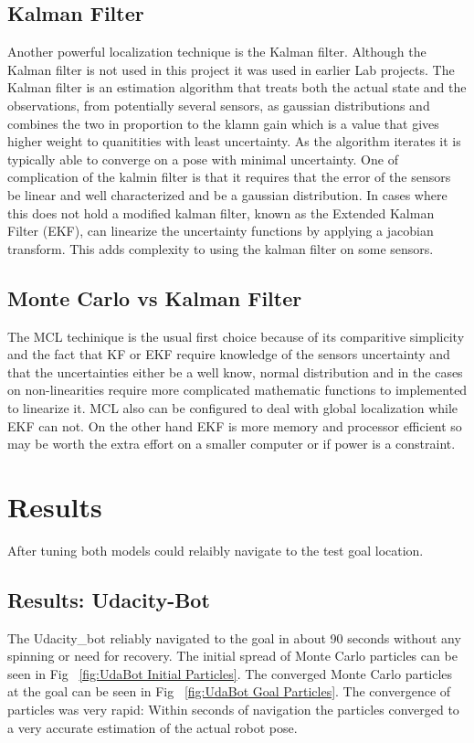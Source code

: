 \documentclass[10pt,journal,compsoc]{IEEEtran}
\begin{document}
\subsection{Kalman Filter}
Another powerful localization technique is the Kalman filter. Although the Kalman filter is not used in this project it was used in earlier Lab projects. The Kalman filter is an estimation algorithm that treats both the actual state and the observations, from potentially several sensors, as gaussian distributions and combines the two in proportion to the klamn gain which is a value that gives higher weight to quanitities with least uncertainty. As the algorithm iterates it is typically able to converge on a pose with minimal uncertainty.
One of complication of the kalmin filter is that it requires that the error of the sensors be linear and well characterized and be a gaussian distribution. In cases where this does not hold a modified kalman filter, known as the Extended Kalman Filter (EKF), can linearize the uncertainty functions by applying a jacobian transform. This adds complexity to using the kalman filter on some sensors.

\subsection{Monte Carlo vs Kalman Filter}
The MCL techinique is the usual first choice because of its comparitive simplicity and the fact that KF or EKF require knowledge of the sensors uncertainty and that the uncertainties either be a well know, normal distribution and in the cases on non-linearities require more complicated mathematic functions to implemented to linearize it. MCL also can be configured to deal with global localization while EKF can not. On the other hand EKF is more memory and processor efficient so may be worth the extra effort on a smaller computer or if power is a constraint.

\section{Results}
After tuning both models could relaibly navigate to the test goal location.

\subsection{Results: Udacity-Bot}
The Udacity\_bot reliably navigated to the goal in about 90 seconds without any spinning or need for recovery. The initial spread of Monte Carlo particles can be seen in Fig ~\ref{fig:UdaBot Initial Particles}. The converged Monte Carlo particles at the goal can be seen in Fig ~\ref{fig:UdaBot Goal Particles}. The convergence of particles was very rapid: Within seconds of navigation the particles converged to a very accurate estimation of the actual robot pose.
\end{document}
